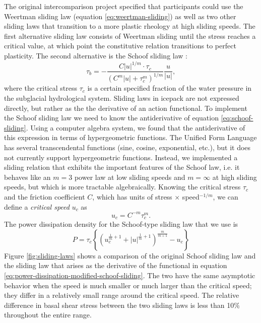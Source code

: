 \documentclass{article}
\theoremstyle{definition}
\theoremstyle{plain}
\begin{document}
The original intercomparison project specified that participants could use the Weertman sliding law (equation \eqref{eq:weertman-sliding}) as well as two other sliding laws that transition to a more plastic rheology at high sliding speeds.
The first alternative sliding law consists of Weertman sliding until the stress reaches a critical value, at which point the constitutive relation transitions to perfect plasticity.
The second alternative is the Schoof sliding law \citep{schoof2005effect}:
\begin{equation}
    \tau_b = -\frac{C|u|^{1/m}\cdot \tau_c}{(C^m|u| + \tau_c^m)^{1/m}}\frac{u}{|u|},
    \label{eq:schoof-sliding}
\end{equation}
where the critical stress $\tau_c$ is a certain specified fraction of the water pressure in the subglacial hydrological system.
Sliding laws in icepack are not expressed directly, but rather as the the derivative of an action functional.
To implement the Schoof sliding law we need to know the antiderivative of equation \eqref{eq:schoof-sliding}.
Using a computer algebra system, we found that the antiderivative of this expression in terms of hypergeometric functions.
The Unified Form Language has several transcendental functions (sine, cosine, exponential, etc.), but it does not currently support hypergeometric functions.
Instead, we implemented a sliding relation that exhibits the important features of the Schoof law, i.e. it behaves like an $m = 3$ power law at low sliding speeds and $m = \infty$ at high sliding speeds, but which is more tractable algebraically.
Knowing the critical stress $\tau_c$ and the friction coefficient $C$, which has units of stress $\times$ speed${}^{-1/m}$, we can define a \emph{critical speed} $u_c$ as
\begin{equation}
    u_c = C^{-m}\tau_c^m.
\end{equation}
The power dissipation density for the Schoof-type sliding law that we use is
\begin{equation}
    P = \tau_c\left\{\left(u_c^{\frac{1}{m} + 1} + |u|^{\frac{1}{m} + 1}\right)^{\frac{m}{m + 1}} - u_c\right\}
    \label{eq:power-dissipation-modified-schoof-sliding}
\end{equation}
Figure \ref{fig:sliding-laws} shows a comparison of the original Schoof sliding law and the sliding law that arises as the derivative of the functional in equation \eqref{eq:power-dissipation-modified-schoof-sliding}.
The two have the same asymptotic behavior when the speed is much smaller or much larger than the critical speed; they differ in a relatively small range around the critical speed.
The relative difference in basal shear stress between the two sliding laws is less than 10\% throughout the entire range.
\end{document}
